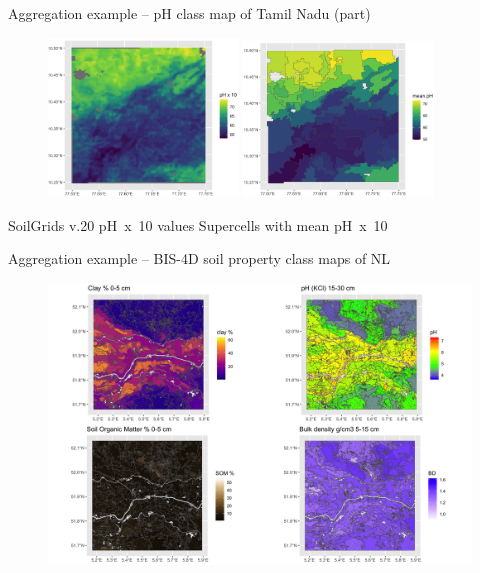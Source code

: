 \documentclass[aspectratio=169, 10pt]{beamer}
\begin{document}
\begin{frame}{Aggregation example -- pH class map of Tamil Nadu (part)}
    \begin{figure}
      \includegraphics[width=0.45\textwidth]{graphics_david/SLIC-source-1.png}
      \hfill
      \includegraphics[width=0.45\textwidth]{graphics_david/supercells-not-compact-1.png}
    \end{figure}
    SoilGrids v.20 pH~x~10 values \hfill Supercells with mean pH~x~10
\end{frame}

\begin{frame}{Aggregation example -- BIS-4D soil property class maps of NL}
    \begin{figure}
        \centering        \includegraphics[height=0.70\textheight]{graphics_david/plot-supercells-bis4d-1-jsd-all-4up-1.png}
      \end{figure}
\end{frame}
\end{document}
